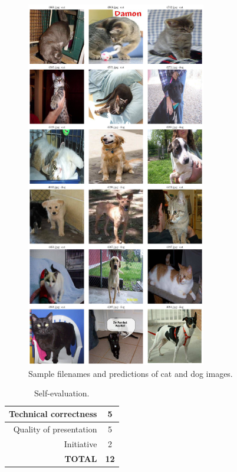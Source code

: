 \documentclass[12pt,a4paper]{article}
\begin{document}
\begin{figure}[htb]
	\centering
	\includegraphics[width=0.7\textwidth]{outputs.png}
	\caption{Sample filenames and predictions of cat and dog images.}
	\label{fig:outputs}
\end{figure}


\begin{table}[!htb]
	\centering
	\caption{Self-evaluation.}
	\begin{tabular}{||r|c||}
		\hline
		Technical correctness & 5 \\ \hline
		Quality of presentation & 5 \\ \hline
		Initiative & 2 \\ \hline
		\textbf{TOTAL} & \textbf{12} \\ \hline
	\end{tabular}
	\label{tab:self-eval}
\end{table}



\end{document}
